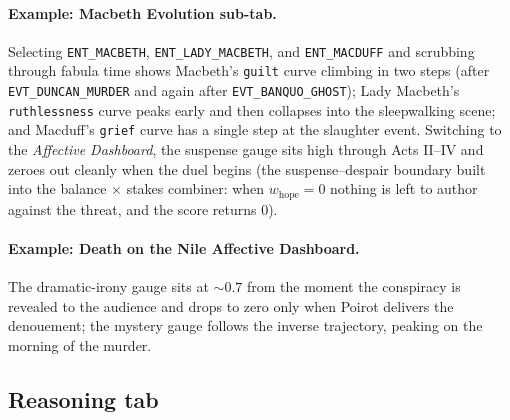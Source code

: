 \documentclass[11pt]{article}
\begin{document}
\paragraph{Example: Macbeth Evolution sub-tab.} Selecting
\texttt{ENT\_MACBETH}, \texttt{ENT\_LADY\_MACBETH}, and
\texttt{ENT\_MACDUFF} and scrubbing through fabula time shows
Macbeth's \texttt{guilt} curve climbing in two steps (after
\texttt{EVT\_DUNCAN\_MURDER} and again after
\texttt{EVT\_BANQUO\_GHOST}); Lady Macbeth's
\texttt{ruthlessness} curve peaks early and then collapses into
the sleepwalking scene; and Macduff's \texttt{grief} curve has a
single step at the slaughter event. Switching to the
\emph{Affective Dashboard}, the suspense gauge sits high through
Acts II--IV and zeroes out cleanly when the duel begins
(the suspense--despair boundary built into the
balance$\,\times\,$stakes combiner: when $w_{\mathrm{hope}} = 0$
nothing is left to author against the threat, and the score
returns 0).

\paragraph{Example: Death on the Nile Affective Dashboard.}
The dramatic-irony gauge sits at $\sim 0.7$ from the moment the
conspiracy is revealed to the audience and drops to zero only
when Poirot delivers the denouement; the mystery gauge follows
the inverse trajectory, peaking on the morning of the murder.

\subsection{Reasoning tab}
\label{app:ui-reasoning}
\end{document}
